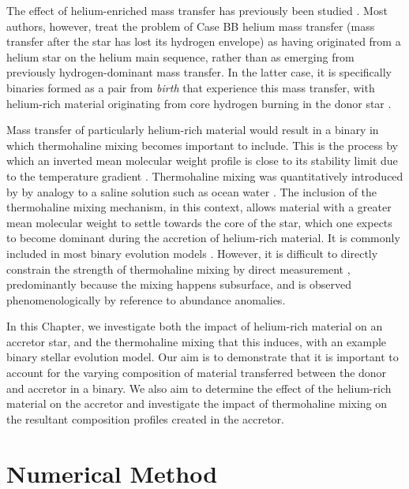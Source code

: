The effect of helium-enriched mass transfer has previously been studied \citep[e.g.,][]{Delgado:1981}. Most authors, however, treat the problem of Case BB helium mass transfer (mass transfer after the star has lost its hydrogen envelope) as having originated from a helium star on the helium main sequence, rather than as emerging from previously hydrogen-dominant mass transfer. In the latter case, it is specifically binaries formed as a pair from \textit{birth} that experience this mass transfer, with helium-rich material originating from core hydrogen burning in the donor star \citep[e.g.,][]{Renzo:2021}.

Mass transfer of particularly helium-rich material would result in a binary in which thermohaline mixing becomes important to include. This is the process by which an inverted mean molecular weight profile is close to its stability limit due to the temperature gradient \citep[e.g.][]{Ulrich:1972, Kippenhahn:1980, Charbonnel:2007, Angelou:2011, Fraser:2022}. Thermohaline mixing was quantitatively introduced by \citet{Ulrich:1972} by analogy to a saline solution such as ocean water \citep{Stern:1960}. The inclusion of the thermohaline mixing mechanism, in this context, allows material with a greater mean molecular weight to settle towards the core of the star, which one expects to become dominant during the accretion of helium-rich material. It is commonly included in most binary evolution models \citep[e.g.,][]{Fragos:2023, Sen:2023}. However, it is difficult to directly constrain the strength of thermohaline mixing by direct measurement \citep[e.g.,][and references therein]{Stancliffe:2008, Angelou:2011, Angelou:2012}, predominantly because the mixing happens subsurface, and is observed phenomenologically by reference to abundance anomalies.

In this Chapter, we investigate both the impact of helium-rich material on an accretor star, and the thermohaline mixing that this induces, with an example binary stellar evolution model. Our aim is to demonstrate that it is important to account for the varying composition of material transferred between the donor and accretor in a binary. We also aim to determine the effect of the helium-rich material on the accretor and investigate the impact of thermohaline mixing on the resultant composition profiles created in the accretor.

\section{Numerical Method}

